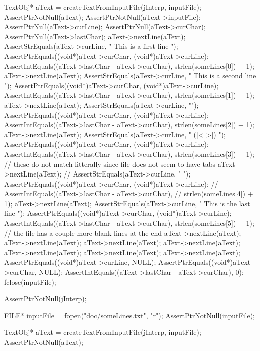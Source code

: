   TextObj* aText = createTextFromInputFile(jInterp, inputFile);
  AssertPtrNotNull(aText);
  AssertPtrNotNull(aText->inputFile);
  AssertPtrNull(aText->curLine);
  AssertPtrNull(aText->curChar);
  AssertPtrNull(aText->lastChar);
  aText->nextLine(aText);
  AssertStrEquals(aText->curLine, "  This is a first line  \n");
  AssertPtrEquals((void*)aText->curChar, (void*)aText->curLine);
  AssertIntEquals((aText->lastChar - aText->curChar),
                        strlen(someLines[0]) + 1);
  aText->nextLine(aText);
  AssertStrEquals(aText->curLine, "  This is a second line   \n");
  AssertPtrEquals((void*)aText->curChar, (void*)aText->curLine);
  AssertIntEquals((aText->lastChar - aText->curChar),
                        strlen(someLines[1]) + 1);
  aText->nextLine(aText);
  AssertStrEquals(aText->curLine, "\n");
  AssertPtrEquals((void*)aText->curChar, (void*)aText->curLine);
  AssertIntEquals((aText->lastChar - aText->curChar),
                        strlen(someLines[2]) + 1);
  aText->nextLine(aText);
  AssertStrEquals(aText->curLine, " ([<{ }>]) \n");
  AssertPtrEquals((void*)aText->curChar, (void*)aText->curLine);
  AssertIntEquals((aText->lastChar - aText->curChar),
                        strlen(someLines[3]) + 1);
  // these do not match litterally since file does not seem to have tabs
  aText->nextLine(aText);
//  AssertStrEquals(aText->curLine, "     	\n");
  AssertPtrEquals((void*)aText->curChar, (void*)aText->curLine);
//  AssertIntEquals((aText->lastChar - aText->curChar),
//                        strlen(someLines[4]) + 1);
  aText->nextLine(aText);
  AssertStrEquals(aText->curLine, "  This is the last line  \n");
  AssertPtrEquals((void*)aText->curChar, (void*)aText->curLine);
  AssertIntEquals((aText->lastChar - aText->curChar),
                        strlen(someLines[5]) + 1);
  // the file has a couple more blank lines at the end
  aText->nextLine(aText);
  aText->nextLine(aText);
  aText->nextLine(aText);
  aText->nextLine(aText);
  aText->nextLine(aText);
  aText->nextLine(aText);
  aText->nextLine(aText);
  AssertPtrEquals((void*)aText->curLine, NULL);
  AssertPtrEquals((void*)aText->curChar, NULL);
  AssertIntEquals((aText->lastChar - aText->curChar), 0);
  fclose(inputFile);
\stopCTest
\stopTestCase

\startCTest
  AssertPtrNotNull(jInterp);

  FILE* inputFile = fopen("doc/someLines.txt", "r");
  AssertPtrNotNull(inputFile);
  
  TextObj* aText = createTextFromInputFile(jInterp, inputFile);
  AssertPtrNotNull(aText);

